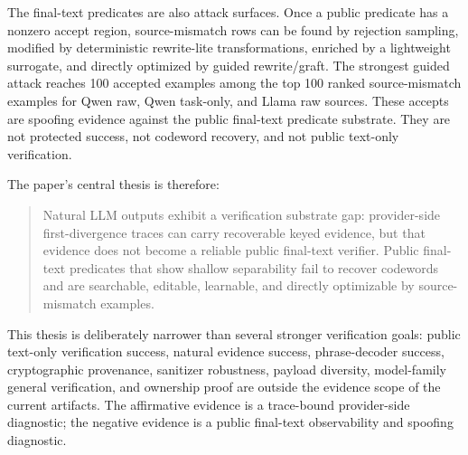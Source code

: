The final-text predicates are also attack surfaces.  Once a public predicate
has a nonzero accept region, source-mismatch rows can be found by rejection
sampling, modified by deterministic rewrite-lite transformations, enriched by
a lightweight surrogate, and directly optimized by guided rewrite/graft.  The
strongest guided attack reaches 100 accepted examples among the top 100 ranked
source-mismatch examples for Qwen raw, Qwen task-only, and Llama raw sources.
These accepts are spoofing evidence against the public final-text predicate
substrate.  They are not protected success, not codeword recovery, and not
public text-only verification.

The paper's central thesis is therefore:
\begin{quote}
Natural LLM outputs exhibit a verification substrate gap: provider-side
first-divergence traces can carry recoverable keyed evidence, but that evidence
does not become a reliable public final-text verifier.  Public final-text
predicates that show shallow separability fail to recover codewords and are
searchable, editable, learnable, and directly optimizable by source-mismatch
examples.
\end{quote}

This thesis is deliberately narrower than several stronger verification goals:
public text-only verification success, natural evidence success,
phrase-decoder success, cryptographic provenance, sanitizer robustness,
payload diversity, model-family general verification, and ownership proof are
outside the evidence scope of the current artifacts.  The affirmative evidence
is a trace-bound provider-side diagnostic; the negative evidence is a public
final-text observability and spoofing diagnostic.

